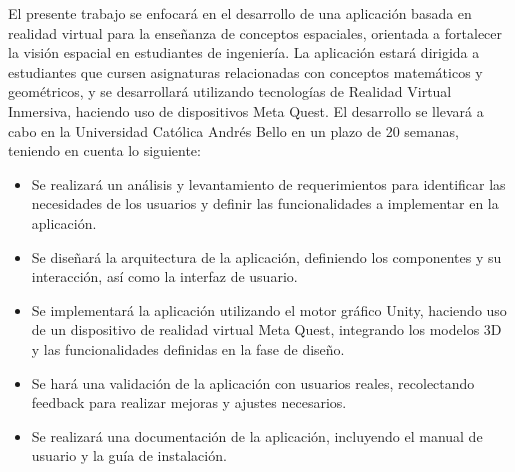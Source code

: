 
El presente trabajo se enfocará en el desarrollo de una aplicación basada en realidad virtual para la enseñanza de conceptos espaciales, orientada a fortalecer la visión espacial en estudiantes de ingeniería. La aplicación estará dirigida a estudiantes que cursen asignaturas relacionadas con conceptos matemáticos y geométricos, y se desarrollará utilizando tecnologías de Realidad Virtual Inmersiva, haciendo uso de dispositivos Meta Quest. El desarrollo se llevará a cabo en la Universidad Católica Andrés Bello en un plazo de 20 semanas, teniendo en cuenta lo siguiente:

\begin{itemize}
  \item Se realizará un análisis y levantamiento de requerimientos para identificar las necesidades de los usuarios y definir las funcionalidades a implementar en la aplicación.
  \item Se diseñará la arquitectura de la aplicación, definiendo los componentes y su interacción, así como la interfaz de usuario.
  \item Se implementará la aplicación utilizando el motor gráfico Unity, haciendo uso de un dispositivo de realidad virtual Meta Quest, integrando los modelos 3D y las funcionalidades definidas en la fase de diseño.
  \item Se hará una validación de la aplicación con usuarios reales, recolectando feedback para realizar mejoras y ajustes necesarios.
  \item Se realizará una documentación de la aplicación, incluyendo el manual de usuario y la guía de instalación.
\end{itemize}
